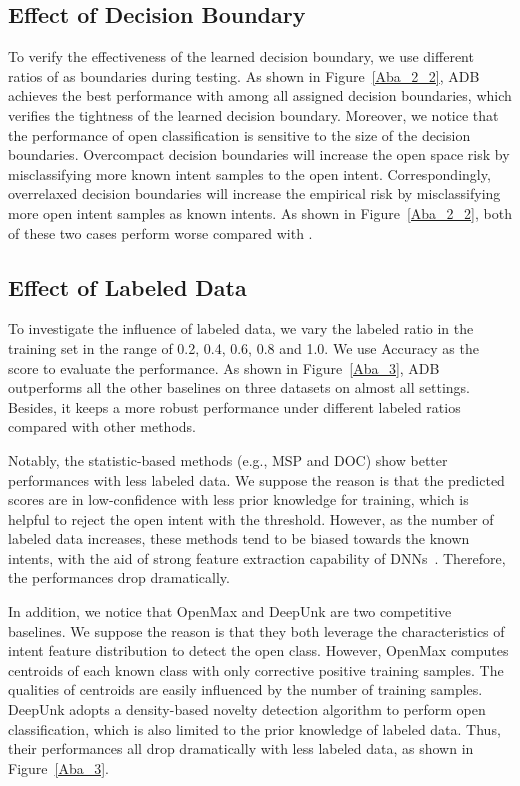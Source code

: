 \documentclass[letterpaper]{article} \usepackage{aaai21}  \usepackage{times}  \usepackage{helvet} \usepackage{courier}  \usepackage[hyphens]{url}  \usepackage{graphicx} \urlstyle{rm} \def\UrlFont{\rm}  \usepackage{natbib}  \usepackage{caption} \frenchspacing  \setlength{\pdfpagewidth}{8.5in}  \setlength{\pdfpageheight}{11in}  \usepackage{amsmath}
\begin{document}
	\subsection{Effect of Decision Boundary}
	To verify the effectiveness of the learned decision boundary, we use different ratios of  as boundaries during testing. As shown in Figure~\ref{Aba_2_2}, ADB achieves the best performance with  among all assigned decision boundaries, which verifies the tightness of the learned decision boundary. Moreover, we notice that the performance of open classification is sensitive to the size of the decision boundaries. Overcompact decision boundaries will increase the open space risk by misclassifying more known intent samples to the open intent. Correspondingly, overrelaxed decision boundaries will increase the empirical risk by misclassifying more open intent samples as known intents. As shown in Figure~\ref{Aba_2_2}, both of these two cases perform worse compared with . 
	
	\subsection{Effect of Labeled Data}
	To investigate the influence of labeled data, we vary the labeled ratio in the training set in the range of 0.2, 0.4, 0.6, 0.8 and 1.0. We use Accuracy as the score to evaluate the performance. As shown in Figure~\ref{Aba_3}, ADB outperforms all the other baselines on three datasets on almost all settings. Besides, it keeps a more robust performance under different labeled ratios compared with other methods. 
	
	Notably, the statistic-based methods (e.g., MSP and DOC) show better performances with less labeled data. We suppose the reason is that the predicted scores are in low-confidence with less prior knowledge for training, which is helpful to reject the open intent with the threshold. However, as the number of labeled data increases, these methods tend to be biased towards the known intents, with the aid of strong feature extraction capability of DNNs~\cite{7298640}. Therefore, the performances drop dramatically. 
	

	In addition, we notice that OpenMax and DeepUnk are two competitive baselines. We suppose the reason is that they both leverage the characteristics of intent feature distribution to detect the open class. However, OpenMax computes centroids of each known class with only corrective positive training samples. The qualities of centroids are easily influenced by the number of training samples. DeepUnk adopts a density-based novelty detection algorithm to perform open classification, which is also limited to the prior knowledge of labeled data. Thus, their performances all drop dramatically with less labeled data, as shown in Figure~\ref{Aba_3}.
	
\end{document}
